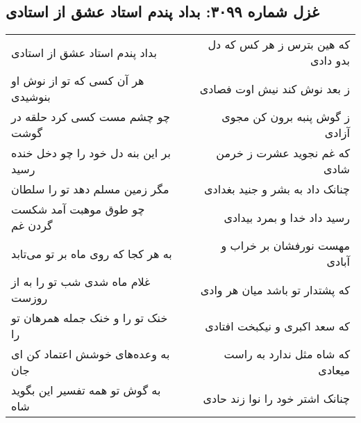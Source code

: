 \begin{center}
\section*{غزل شماره ۳۰۹۹: بداد پندم استاد عشق از استادی}
\label{sec:3099}
\begin{longtable}{l p{0.5cm} r}
بداد پندم استاد عشق از استادی
&&
که هین بترس ز هر کس که دل بدو دادی
\\
هر آن کسی که تو از نوش او بنوشیدی
&&
ز بعد نوش کند نیش اوت فصادی
\\
چو چشم مست کسی کرد حلقه در گوشت
&&
ز گوش پنبه برون کن مجوی آزادی
\\
بر این بنه دل خود را چو دخل خنده رسید
&&
که غم نجوید عشرت ز خرمن شادی
\\
مگر زمین مسلم دهد تو را سلطان
&&
چنانک داد به بشر و جنید بغدادی
\\
چو طوق موهبت آمد شکست گردن غم
&&
رسید داد خدا و بمرد بیدادی
\\
به هر کجا که روی ماه بر تو می‌تابد
&&
مهست نورفشان بر خراب و آبادی
\\
غلام ماه شدی شب تو را به از روزست
&&
که پشتدار تو باشد میان هر وادی
\\
خنک تو را و خنک جمله همرهان تو را
&&
که سعد اکبری و نیکبخت افتادی
\\
به وعده‌های خوشش اعتماد کن ای جان
&&
که شاه مثل ندارد به راست میعادی
\\
به گوش تو همه تفسیر این بگوید شاه
&&
چنانک اشتر خود را نوا زند حادی
\\
\end{longtable}
\end{center}
